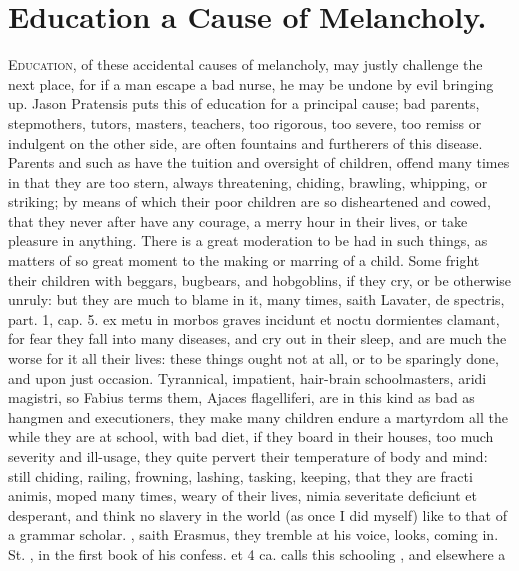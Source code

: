 {%
\section{Education a Cause of Melancholy.}

\lettrine{E}{ducation}, of these accidental causes of melancholy, may justly
challenge the next place, for if a man escape a bad nurse, he may be
undone by evil bringing up. Jason Pratensis puts this of
education for a principal cause; bad parents, stepmothers, tutors,
masters, teachers, too rigorous, too severe, too remiss or indulgent on
the other side, are often fountains and furtherers of this disease.
Parents and such as have the tuition and oversight of children, offend
many times in that they are too stern, always threatening, chiding,
brawling, whipping, or striking; by means of which their poor children
are so disheartened and cowed, that they never after have any courage,
a merry hour in their lives, or take pleasure in anything. There is a
great moderation to be had in such things, as matters of so great
moment to the making or marring of a child. Some fright their children
with beggars, bugbears, and hobgoblins, if they cry, or be otherwise
unruly: but they are much to blame in it, many times, saith Lavater, de
spectris, part. 1, cap. 5. ex metu in morbos graves incidunt et noctu
dormientes clamant, for fear they fall into many diseases, and cry out
in their sleep, and are much the worse for it all their lives: these
things ought not at all, or to be sparingly done, and upon just
occasion. Tyrannical, impatient, hair-brain schoolmasters, aridi
magistri, so Fabius terms them, Ajaces flagelliferi, are in this
kind as bad as hangmen and executioners, they make many children endure
a martyrdom all the while they are at school, with bad diet, if they
board in their houses, too much severity and ill-usage, they quite
pervert their temperature of body and mind: still chiding, railing,
frowning, lashing, tasking, keeping, that they are fracti animis, moped
many times, weary of their lives, nimia severitate deficiunt et
desperant, and think no slavery in the world (as once I did myself)
like to that of a grammar scholar. , saith Erasmus, they tremble at his voice,
looks, coming in. St. \Austin{}, in the first book of his confess. et 4
ca. calls this schooling , and elsewhere a
}
